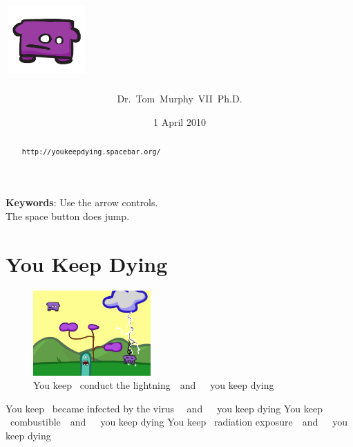 \documentclass[twocolumn]{article}
\newcommand\ykd[1]{You keep ~{#1}~~and~~~you keep dying\qquad}
\begin{document}
 

\title{\includegraphics[width=4em]{you}\qquad{}~~~~~~~~~~~~~~~~~~~~~~~~}
\author{Dr.~Tom~Murphy~VII~Ph.D.}
\date{1 April 2010}

\maketitle

\begin{abstract}
{\tt http://youkeepdying.spacebar.org/ }
\end{abstract}


\vspace{1em}
{\noindent \small {\bf Keywords}:
  Use the arrow controls.\\
 The space button does jump.
}

\section*{You Keep Dying}

\begin{figure}[b!]
\includegraphics[width=0.40\textwidth]{lightning}
\caption{\tiny \ykd{conduct the lightning}} \label{fig:lightning}
\end{figure}

\ykd{became infected by the virus \newline}
\ykd{\newline combustible}
\ykd{radiation exposure}
\end{document}

